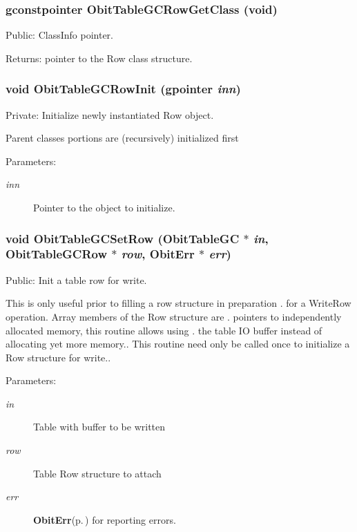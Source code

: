 \subsubsection{\setlength{\rightskip}{0pt plus 5cm}gconstpointer Obit\-Table\-GCRow\-Get\-Class (void)}\label{ObitTableGC_8c_a15}


Public: Class\-Info pointer. 

\begin{Desc}
\item[Returns:]pointer to the Row class structure. \end{Desc}
\subsubsection{\setlength{\rightskip}{0pt plus 5cm}void Obit\-Table\-GCRow\-Init (gpointer {\em inn})}\label{ObitTableGC_8c_a6}


Private: Initialize newly instantiated Row object. 

Parent classes portions are (recursively) initialized first \begin{Desc}
\item[Parameters:]
\begin{description}
\item[{\em inn}]Pointer to the object to initialize. \end{description}
\end{Desc}
\subsubsection{\setlength{\rightskip}{0pt plus 5cm}void Obit\-Table\-GCSet\-Row ({\bf Obit\-Table\-GC} $\ast$ {\em in}, {\bf Obit\-Table\-GCRow} $\ast$ {\em row}, {\bf Obit\-Err} $\ast$ {\em err})}\label{ObitTableGC_8c_a23}


Public: Init a table row for write. 

This is only useful prior to filling a row structure in preparation . for a Write\-Row operation. Array members of the Row structure are . pointers to independently allocated memory, this routine allows using . the table IO buffer instead of allocating yet more memory.. This routine need only be called once to initialize a Row structure for write.. \begin{Desc}
\item[Parameters:]
\begin{description}
\item[{\em in}]Table with buffer to be written \item[{\em row}]Table Row structure to attach \item[{\em err}]{\bf Obit\-Err}{\rm (p.\,\pageref{structObitErr})} for reporting errors. \end{description}
\end{Desc}
